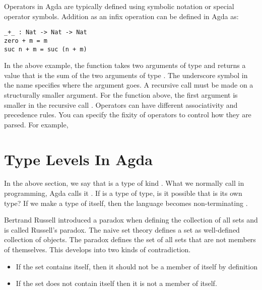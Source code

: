 Operators in Agda are typically defined using symbolic notation or special
operator symbols. Addition as an infix operation can be defined in Agda as:

\label{code:Add}
\begin{verbatim}
_+_ : Nat -> Nat -> Nat
zero + m = m
suc n + m = suc (n + m)
\end{verbatim}

In the above example, the function \inline{_+_} takes two arguments of type
 and returns a value that is the sum of the two arguments of type
. The underscore symbol in the name specifies where the argument
goes. A recursive call must be made on a structurally smaller argument. For the
function \inline{_+_} above, the first argument  is smaller in the
recursive call . Operators can have different associativity and
precedence rules. You can specify the fixity of operators to control how they
are parsed. For example,

\section{Type Levels In Agda}
\label{level}
In the above section, we say that  is a type of kind .
What we normally call  in programming, Agda calls it .
If  is a type of type, is it possible that  is its own
type? If we make  a type of itself, then the language becomes
non-terminating \cite{AgdaTB}. 

Bertrand Russell introduced a paradox when defining the collection of all sets and
is called Russell's paradox. The naive set theory defines a set as well-defined
collection of objects. The paradox \cite{russell2020principles} defines the set
of all sets that are not members of themselves. This develops into two kinds of
contradiction.
\begin{itemize}
  \item If the set contains itself, then it should not be a member of itself by
  definition
  \item If the set does not contain itself then it is not a member of itself.
\end{itemize}

